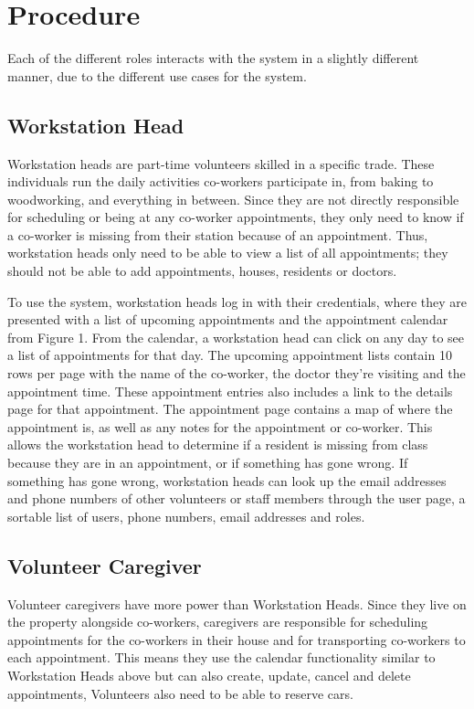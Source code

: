 \documentclass{sig-alternate}
\begin{document}
\section{Procedure}
Each of the different roles interacts with the system in a slightly different manner, due to the different use cases for the system.

\subsection{Workstation Head}
Workstation heads are part-time volunteers skilled in a specific trade. These individuals run the daily activities co-workers participate in, from baking to woodworking, and everything in between. Since they are not directly responsible for scheduling or being at any co-worker appointments, they only need to know if a co-worker is missing from their station because of an appointment. Thus, workstation heads only need to be able to view a list of all appointments; they should not be able to add appointments, houses, residents or doctors.

To use the system, workstation heads log in with their credentials, where they are presented with a list of upcoming appointments and the appointment calendar from Figure 1. From the calendar, a workstation head can click on any day to see a list of appointments for that day. The upcoming appointment lists contain 10 rows per page with the name of the co-worker, the doctor they're visiting and the appointment time. These appointment entries also includes a link to the details page for that appointment. The appointment page contains a map of where the appointment is, as well as any notes for the appointment or co-worker. This allows the workstation head to determine if a resident is missing from class because they are in an appointment, or if something has gone wrong. If something has gone wrong, workstation heads can look up the email addresses and phone numbers of other volunteers or staff members through the user page, a sortable list of users, phone numbers, email addresses and roles.

\subsection{Volunteer Caregiver}
Volunteer caregivers have more power than Workstation Heads. Since they live on the property alongside co-workers, caregivers are responsible for scheduling appointments for the co-workers in their house and for transporting co-workers to each appointment. This means they use the calendar functionality similar to Workstation Heads above but can also create, update, cancel and delete appointments, Volunteers also need to be able to reserve cars.
\end{document}
